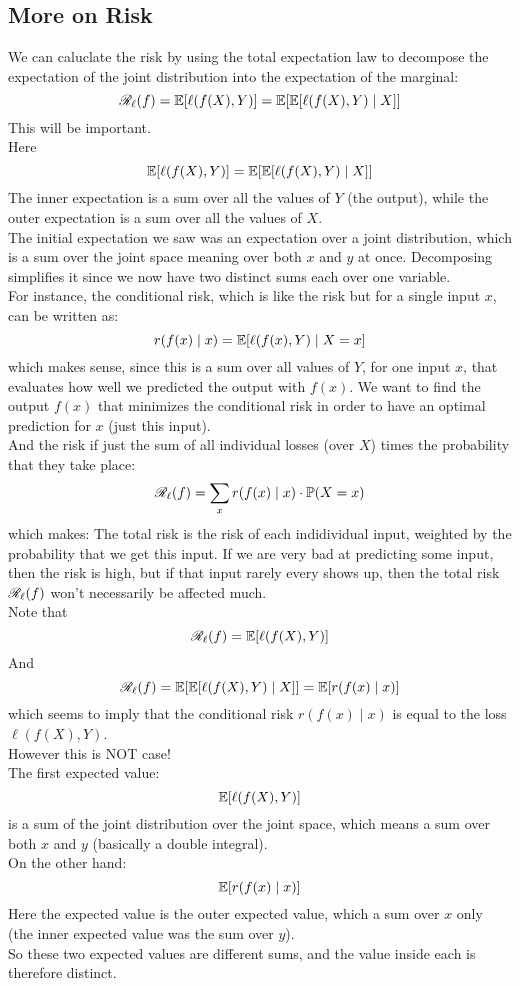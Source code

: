 \documentclass[12pt]{article}
\begin{document}
\newpage

\subsection*{More on Risk}

We can caluclate the risk by
using the total expectation law to decompose
the expectation of the joint distribution
into the expectation of the marginal:
\[ \mathscr{R}_\ell(f)
= \mathbb{E}[\ell(f(X), Y)]
= \mathbb{E}[\mathbb{E}[\ell(f(X), Y) \mid X]] \]
This will be important. \\

Here
\[ \mathbb{E}[\ell(f(X), Y)]
= \mathbb{E}[\mathbb{E}[\ell(f(X), Y) \mid X]] \]
The inner expectation is a sum over
all the values of $Y$ (the output),
while the outer expectation is a sum over
all the values of $X$. \\
The initial expectation we saw was an expectation
over a joint distribution,
which is a sum over the joint space
meaning over both $x$ and $y$ at once.
Decomposing simplifies it since we now
have two distinct sums each over one variable. \\

For instance, the conditional risk,
which is like the risk
but for a single input $x$,
can be written as:
\[ r(f(x) \mid x)
= \mathbb{E}[\ell(f(x), Y) \mid X = x] \]
which makes sense, since this is a sum
over all values of $Y$,
for one input $x$,
that evaluates how well we predicted
the output with $f(x)$.
We want to find the output $f(x)$
that minimizes the conditional
risk in order to have an optimal
prediction for $x$ (just this input). \\

And the risk if just the sum of all individual
losses (over $X$)
times the probability that they take place:
\[ \mathscr{R}_\ell(f) = 
\sum_{x} r(f(x) \mid x)\cdot \mathbb{P}(X = x) \]
which makes:
The total risk is the risk of each 
indidividual input,
weighted by the probability that we get this input.
If we are very bad at predicting some input,
then the risk is high,
but if that input rarely every shows up,
then the total risk $\mathscr{R}_\ell(f)$
won't necessarily be affected much. \\ 

Note that
\[ \mathscr{R}_\ell(f) = \mathbb{E}[\ell(f(X), Y)] \]
And
\[ \mathscr{R}_\ell(f) = \mathbb{E}[\mathbb{E}[\ell(f(X), Y) \mid X]] 
= \mathbb{E}[r(f(x) \mid x)] \]
which seems to imply that the conditional
risk $r(f(x) \mid x)$
is equal to the loss $\ell(f(X), Y)$. \\
However this is NOT case! \\
The first expected value:
\[ \mathbb{E}[\ell(f(X), Y)] \] 
is a sum of the joint distribution
over the joint space,
which means a sum over both $x$ and $y$
(basically a double integral). \\
On the other hand:
\[ \mathbb{E}[r(f(x) \mid x)] \]
Here the expected value is the outer
expected value,
which a sum over $x$ only (the inner expected
value was the sum over $y$). \\
So these two expected values are
different sums,
and the value inside each is therefore distinct. \\
\end{document}
